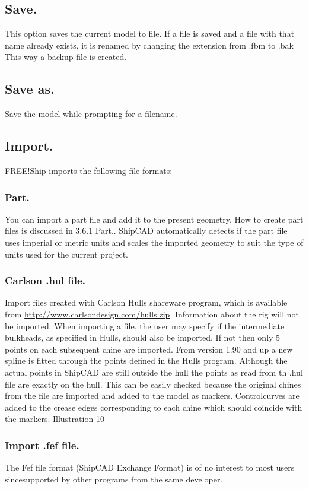 \documentclass[12pt]{article}
\begin{document}
\subsection{Save.}
This option saves the current model to file. If a file is saved and a file with that name already exists,
it is renamed by changing the extension from .fbm to .bak This way a backup file is created.

\subsection{Save as.}
Save the model while prompting for a filename.

\subsection{Import.}
FREE!Ship imports the following file formats:

\subsubsection{Part.}
You can import a part file and add it to the present geometry. How to create part files is discussed in
3.6.1 Part.. ShipCAD automatically detects if the part file uses imperial or metric units and scales
the imported geometry to suit the type of units used for the current project.

\subsubsection{Carlson .hul file.}
Import files created with Carlson Hulls shareware program, which is available from
\url{http://www.carlsondesign.com/hulls.zip}. Information about the rig will not be imported. When
importing a file, the user may specify if the intermediate bulkheads, as specified in Hulls, should
also be imported. If not then only 5 points on each subsequent chine are imported. From version
1.90 and up a new spline is fitted through the points defined in
the Hulls program. Although the actual points in ShipCAD are
still outside the hull the points as read from th .hul file are
exactly on the hull. This can be easily checked because the
original chines from the file are imported and added to the
model as markers. Controlcurves are added to the crease
edges corresponding to each chine which should coincide with
the markers.
Illustration 10

\subsubsection{Import .fef file.}
The Fef file format (ShipCAD Exchange Format) is of no interest to most users sincesupported by other programs from the same developer.
\end{document}
